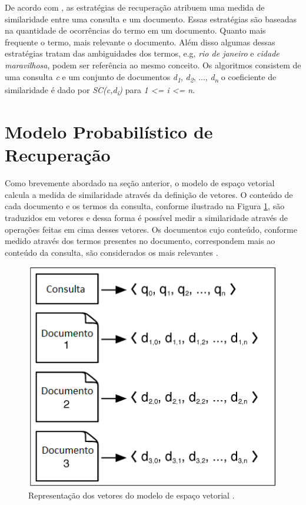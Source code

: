 De acordo com \citep{Grossman2004}, as estratégias de recuperação atribuem uma medida de similaridade entre uma consulta e um documento. Essas estratégias são baseadas na quantidade de ocorrências do termo em um documento. Quanto mais frequente o termo, mais relevante o documento. Além disso algumas dessas estratégias tratam das ambiguidades dos termos, e.g, \textit{rio de janeiro} e \textit{cidade maravilhosa}, podem ser referência ao mesmo conceito.
Os algoritmos consistem de uma consulta \textit{c} e um conjunto de documentos \textit{d\textsubscript{1}}, \textit{d\textsubscript{2}}, ..., \textit{d\textsubscript{n}} o coeficiente de similaridade é dado por \textit{SC(c,d\textsubscript{i})} para \textit{1 <= i <= n}.



\section{Modelo Probabilístico de Recuperação}

Como brevemente abordado na seção anterior, o modelo de espaço vetorial calcula a medida de similaridade através da definição de vetores. O conteúdo de cada documento e os termos da consulta, conforme ilustrado na Figura \ref{fig:documento-vetor}, são traduzidos em vetores e dessa forma é possível medir a similaridade através de operações feitas em cima desses vetores. Os documentos cujo conteúdo, conforme medido através dos termos presentes no documento, correspondem mais ao conteúdo da consulta, são considerados os mais relevantes \citep{Grossman2004}.

\begin{figure}[htb]
	\centering
	\includegraphics[scale=1.0]{chapters/informationretrieval/Document_as_Vectors.png}
	\caption{Representação dos vetores do modelo de espaço vetorial \citep{Grossman2004}.}
	\label{fig:documento-vetor}
\end{figure}

